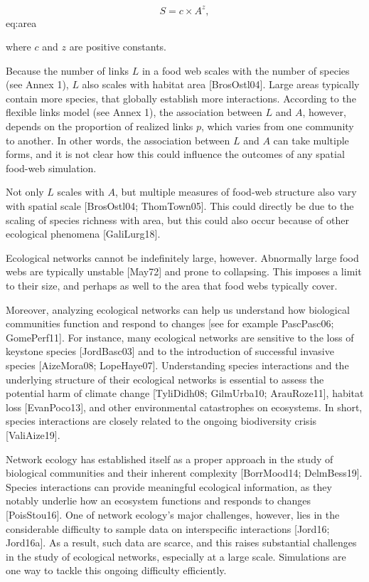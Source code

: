 $$ S = c \times A^z, $$ {eq:area}



where $c$ and $z$ are positive constants.

Because the number of links $L$ in a food web scales with the number of species
(see Annex 1), $L$ also scales with habitat area [BrosOstl04]. Large areas
typically contain more species, that globally establish more interactions.
According to the flexible links model (see Annex 1), the association between $L$
and $A$, however, depends on the proportion of realized links $p$, which varies
from one community to another. In other words, the association between $L$ and
$A$ can take multiple forms, and it is not clear how this could influence the
outcomes of any spatial food-web simulation.

Not only $L$ scales with $A$, but multiple measures of food-web structure also
vary with spatial scale [BrosOstl04; ThomTown05]. This could directly be due
to the scaling of species richness with area, but this could also occur because
of other ecological phenomena [GaliLurg18].

Ecological networks cannot be indefinitely large, however. Abnormally large food
webs are typically unstable [May72] and prone to collapsing. This
imposes a limit to their size, and perhaps as well to the area that food webs
typically cover.






Moreover, analyzing ecological networks can help us understand how biological
communities function and respond to changes [see for example PascPasc06;
GomePerf11]. For instance, many ecological networks are sensitive to the loss
of keystone species [JordBasc03] and to the introduction of successful invasive
species [AizeMora08; LopeHaye07]. Understanding species interactions and the
underlying structure of their ecological networks is essential to assess the
potential harm of climate change [TyliDidh08; GilmUrba10; ArauRoze11],
habitat loss [EvanPoco13], and other environmental catastrophes on ecosystems.
In short, species interactions are closely related to the ongoing biodiversity
crisis [ValiAize19].  

Network
ecology has established itself as a proper approach in the study of biological
communities and their inherent complexity [BorrMood14; DelmBess19]. Species
interactions can provide meaningful ecological information, as they notably
underlie how an ecosystem functions and responds to changes [PoisStou16]. One
of network ecology's major challenges, however, lies in the considerable
difficulty to sample data on interspecific interactions [Jord16; Jord16a]. As
a result, such data are scarce, and this raises substantial challenges in the
study of ecological networks, especially at a large scale. Simulations are one
way to tackle this ongoing difficulty efficiently.

